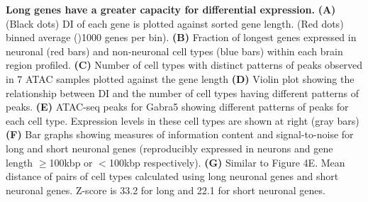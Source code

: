 \textbf{Long genes have a greater capacity for differential expression.}
\textbf{(A)} (Black dots) DI of each gene is plotted against sorted gene length. (Red dots) binned average ()1000 genes per bin).
\textbf{(B)} Fraction of longest genes expressed in neuronal (red bars) and non-neuronal cell types (blue bars) within each brain region profiled.
\textbf{(C)} Number of cell types with distinct patterns of peaks observed in 7 ATAC samples plotted against the gene length
\textbf{(D)} Violin plot showing the relationship between DI and the number of cell types having different patterns of peaks. 
\textbf{(E)} ATAC-seq peaks for Gabra5 showing different patterns of peaks for each cell type. Expression levels in these cell types are shown at right (gray bars)
\textbf{(F)} Bar graphs showing measures of information content and signal-to-noise for long and short neuronal genes (reproducibly expressed in neurons and gene length $\geq$100kbp or $<$100kbp respectively). 
\textbf{(G)} Similar to Figure 4E. Mean distance of pairs of cell types calculated using long neuronal genes and short neuronal genes. Z-score is 33.2 for long and 22.1 for short neuronal genes. 
